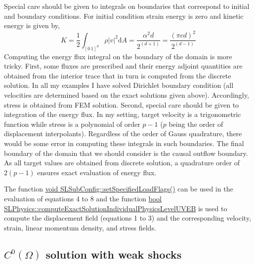 \documentclass[12pt]{article}
\begin{document}
Special care should be given to integrals on boundaries that correspond to initial and boundary conditions. For initial condition strain energy is zero and kinetic energy is given by,
\begin{equation}
K = \frac12 \int_{[0 \ 1]^d} \rho |v|^2 \mathrm{d} A = \frac{\alpha^2 d}{2^{(d + 1)}} = \frac{(\pi  c d)^2}{2^{(d-1)}} 
\end{equation}
%
Computing the energy flux integral on the boundary of the domain is more tricky. First, some fluxes are prescribed and their energy adjoint quantities are obtained from the interior trace that in turn is computed from the discrete solution. In all my examples I have solved Dirichlet boundary condition (all velocities are determined based on the exact solutions given above). Accordingly, stress is obtained from FEM solution. Second, special care should be given to integration of the energy flux. In my setting, target velocity is a trigonometric function while stress is a polynomial of order $p - 1$ ($p$ being the order of displacement interpolants). Regardless of the order of Gauss quadrature, there would be some error in computing these integrals in such boundaries. The final boundary of the domain that we should consider is the causal outflow boundary. As all target values are obtained from discrete solution, a quadrature order of $2 (p - 1)$ ensures exact evaluation of energy flux.



The function \underline{void SLSubConfig::setSpecifiedLoadFlags()} can be used in the evaluation of equations 4 to 8 and the function 
 \underline{bool SLPhysics::computeExactSolutionIndividualPhysicsLevelUVEB} is used to compute the displacement field (equations 1 to 3) and the corresponding velocity, strain, linear momentum density, and stress fields.

\subsection{$C^0(\Omega)$ solution with weak shocks}

% 
%
\end{document}
